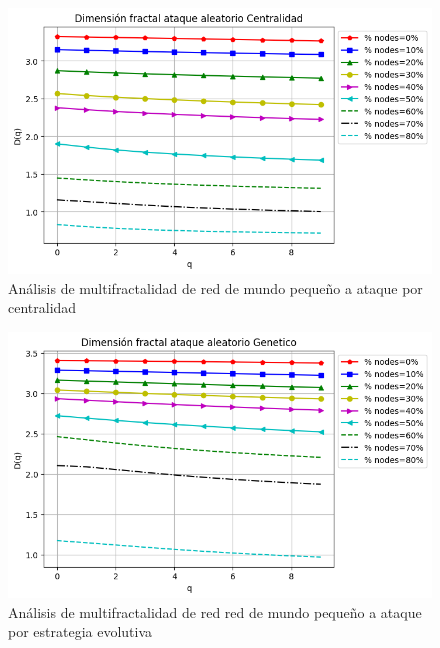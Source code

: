 \begin{figure}[H]
    \centering
    \includegraphics[scale=0.7]{Capitulo6MultifractalidadYRobustez/imagenes/grafica_DqCentrality20180510_143549SmallWorld5000NodesRewire01.png}
    \caption{Análisis de multifractalidad de red de mundo pequeño a ataque por centralidad }
\end{figure}


\begin{figure}[H]
    \centering
    \includegraphics[scale=0.7]{Capitulo6MultifractalidadYRobustez/imagenes/grafica_DqGenetic20180510_143549SmallWorld5000NodesRewire01.png}
    \caption{Análisis de multifractalidad de red red de mundo pequeño a ataque por estrategia evolutiva }
\end{figure}

